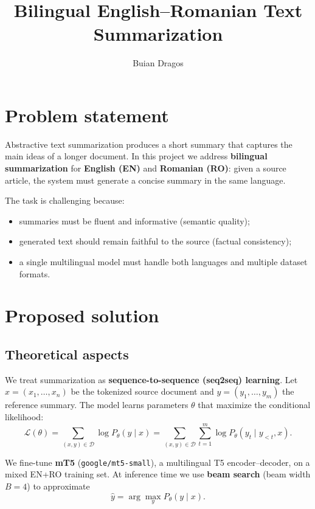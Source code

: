\documentclass[11pt,a4paper]{article}
\title{Bilingual English--Romanian Text Summarization}
\author{Buian Dragos}
\begin{document}
\maketitle

\section{Problem statement}

Abstractive text summarization produces a short summary that captures the main ideas of a longer document.
In this project we address \textbf{bilingual summarization} for \textbf{English (EN)} and \textbf{Romanian (RO)}: given a source article, the system must generate a concise summary in the same language.

The task is challenging because:
\begin{itemize}
  \item summaries must be fluent and informative (semantic quality);
  \item generated text should remain faithful to the source (factual consistency);
  \item a single multilingual model must handle both languages and multiple dataset formats.
\end{itemize}

\section{Proposed solution}

\subsection{Theoretical aspects}

We treat summarization as \textbf{sequence-to-sequence (seq2seq) learning}.
Let $x = (x_1, \ldots, x_n)$ be the tokenized source document and $y = (y_1, \ldots, y_m)$ the reference summary.
The model learns parameters $\theta$ that maximize the conditional likelihood:
\[
  \mathcal{L}(\theta) = \sum_{(x,y) \in \mathcal{D}} \log P_\theta(y \mid x)
  = \sum_{(x,y) \in \mathcal{D}} \sum_{t=1}^{m} \log P_\theta(y_t \mid y_{<t}, x).
\]

We fine-tune \textbf{mT5} (\texttt{google/mt5-small}), a multilingual T5 encoder--decoder, on a mixed EN+RO training set.
At inference time we use \textbf{beam search} (beam width $B=4$) to approximate
\[
  \hat{y} = \arg\max_{y} P_\theta(y \mid x).
\]
\end{document}
